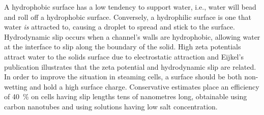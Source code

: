     A hydrophobic surface has a low tendency to support water, i.e., water will bead and roll off a hydrophobic surface.
    Conversely, a hydrophilic surface is one that water \emph{is} attracted to, causing a droplet to spread and stick to the surface.
    Hydrodynamic slip occurs when a channel's walls are hydrophobic, allowing water at the interface to slip along the boundary of the solid.
    High zeta potentials attract water to the solids surface due to electrostatic attraction and Eijkel's publication illustrates that the zeta potential and hydrodynamic slip are related.
    In order to improve the situation in steaming cells, a surface should be both non-wetting and hold a high surface charge.
    Conservative estimates place an efficiency of \SI{40}{\percent} on cells having slip lengths tens of nanometres long, obtainable using carbon nanotubes and using solutions having low salt concentration.









